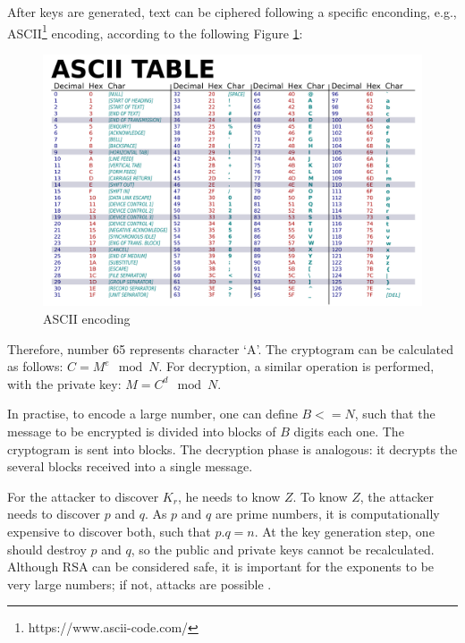 \documentclass[12pt,a4paper]{article}
\theoremstyle{definition}
\begin{document}
After keys are generated, text can be ciphered following a specific enconding, e.g., ASCII\footnote{https://www.ascii-code.com/} encoding, according to the following Figure \ref{fig:ascii}:

\begin{figure}[h]
    \centering
    \includegraphics[scale=0.2]{figures/ascii.png}
    \caption{ASCII encoding}
    \label{fig:ascii}
\end{figure}

Therefore, number 65 represents character `A'. The cryptogram can be calculated as follows: $C = M^e \mod N$. For decryption, a similar operation is performed, with the private key: $M = C^d \mod N$.

In practise, to encode a large number, one can define $B <= N$, such that the message to be encrypted is divided into blocks of $B$ digits each one. The cryptogram is sent into blocks. The decryption phase is analogous: it decrypts the several blocks received into a single message. 

For the attacker to discover $K_r$, he needs to know $Z$. To know $Z$, the attacker needs to discover $p$ and $q$. As $p$ and $q$ are prime numbers, it is computationally expensive to discover both, such that $p.q = n$. At the key generation step, one should destroy $p$ and $q$, so the public and private keys cannot be recalculated. Although RSA can be considered safe, it is important for the exponents to be very large numbers; if not, attacks are possible \cite{wiener90}.


\end{document}
